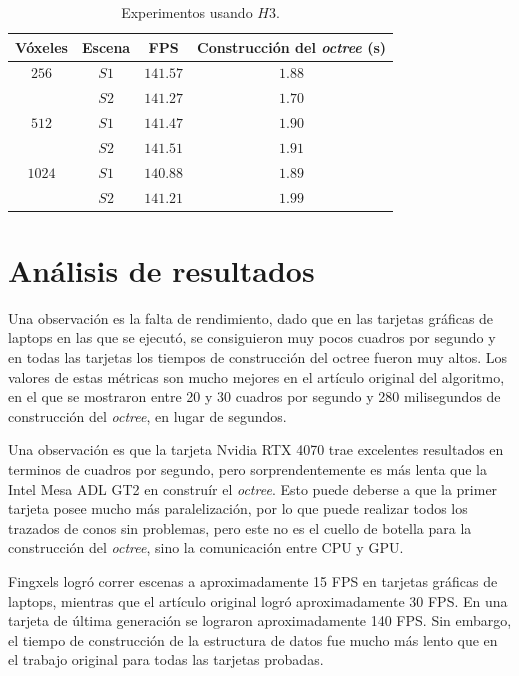 \begin{table}[hb]
\centering
\begin{tabular}{|c|c|c|c|}
	\hline
	\textbf{Vóxeles} & \textbf{Escena} & \textbf{FPS} & \textbf{Construcción del \textit{octree} (s)} \\
	\hline
	$256$ & $S1$ & $141.57$ & $1.88$ \\
	 & $S2$ & $141.27$ & $1.70$ \\
	\hline
	$512$ & $S1$ & $141.47$ & $1.90$ \\
	 & $S2$ & $141.51$ & $1.91$ \\
	\hline
	$1024$ & $S1$ & $140.88$ & $1.89$ \\
	 & $S2$ & $141.21$ & $1.99$ \\
	\hline
\end{tabular}
\caption{Experimentos usando $H3$.}
\label{tab:pizzo-desktop}
\end{table}

\section{Análisis de resultados}

Una observación es la falta de rendimiento, dado que en las tarjetas gráficas de laptops en las que se ejecutó, se consiguieron muy pocos cuadros por segundo y en todas las tarjetas los tiempos de construcción del octree fueron muy altos.
Los valores de estas métricas son mucho mejores en el artículo original del algoritmo, en el que se mostraron entre 20 y 30 cuadros por segundo y 280 milisegundos de construcción del \textit{octree}, en lugar de segundos.

Una observación es que la tarjeta Nvidia RTX 4070 trae excelentes resultados en terminos de cuadros por segundo, pero sorprendentemente es más lenta que la Intel Mesa ADL GT2 en construír el \textit{octree}.
Esto puede deberse a que la primer tarjeta posee mucho más paralelización, por lo que puede realizar todos los trazados de conos sin problemas, pero este no es el cuello de botella para la construcción del \textit{octree}, sino la comunicación entre CPU y GPU.

Fingxels logró correr escenas a aproximadamente 15 FPS en tarjetas gráficas de laptops, mientras que el artículo original logró aproximadamente 30 FPS.
En una tarjeta de última generación se lograron aproximadamente 140 FPS.
Sin embargo, el tiempo de construcción de la estructura de datos fue mucho más lento que en el trabajo original para todas las tarjetas probadas.


